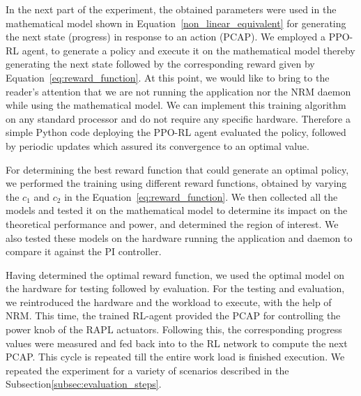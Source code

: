 
In the next part  of the experiment, the obtained parameters were used in the mathematical model shown in Equation~\ref{non_linear_equivalent} for generating the next state (progress) in response to an action (PCAP). We employed a PPO-RL agent, to generate a policy and execute it on the mathematical model thereby generating the next state followed by the corresponding reward given by Equation~\ref{eq:reward_function}. At this point, we would like to bring to the reader's attention that we are not running the application nor the NRM daemon while using the mathematical model. We can implement this training algorithm on any standard processor and do not require any specific hardware. Therefore a simple Python code deploying the PPO-RL agent evaluated the policy, followed by periodic updates which assured its convergence to an optimal value. 

For determining the best reward function that could generate an optimal policy, we performed the training using different reward functions, obtained by varying the $c_1$ and $c_2$ in the Equation~\ref{eq:reward_function}. We then collected all the models and tested it on the mathematical model to determine its impact on the theoretical performance and power, and determined the region of interest. We also tested these models on the hardware running the application and daemon to compare it against the PI controller.

Having determined the optimal reward function, we used the optimal model on the hardware for testing followed by evaluation.
For the testing and evaluation, we reintroduced the hardware and the workload to execute, with the help of NRM. This time, the trained RL-agent provided the PCAP for controlling the power knob of the RAPL actuators. Following this, the corresponding progress values were measured  and fed back into to the RL network to compute the next PCAP. This cycle is repeated till the entire work load is finished execution. 
We repeated the experiment for a variety of scenarios described in the Subsection\ref{subsec:evaluation_steps}.

